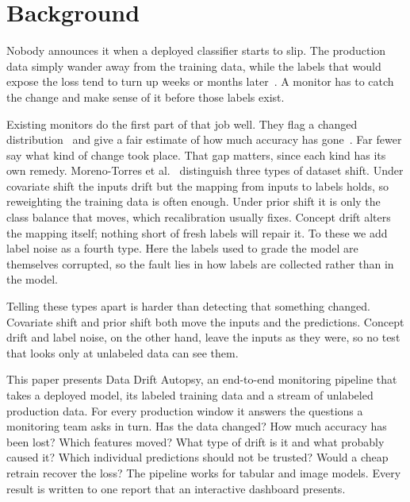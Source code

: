 \documentclass[pdflatex,referee,lineno,sn-basic]{sn-jnl}
\begin{document}

\maketitle


\section{Background}\label{sec:intro}

Nobody announces it when a deployed classifier starts to slip. The production data simply wander away from the training data, while the labels that would expose the loss tend to turn up weeks or months later~\citep{rabanser2019failing}. A monitor has to catch the change and make sense of it before those labels exist.

Existing monitors do the first part of that job well. They flag a changed distribution~\citep{rabanser2019failing} and give a fair estimate of how much accuracy has gone~\citep{garg2022atc,kivimaki2025performance}. Far fewer say what kind of change took place. That gap matters, since each kind has its own remedy. Moreno-Torres et al.~\citeyearpar{moreno2012unifying} distinguish three types of dataset shift. Under covariate shift the inputs drift but the mapping from inputs to labels holds, so reweighting the training data is often enough. Under prior shift it is only the class balance that moves, which recalibration usually fixes. Concept drift alters the mapping itself; nothing short of fresh labels will repair it. To these we add label noise as a fourth type. Here the labels used to grade the model are themselves corrupted, so the fault lies in how labels are collected rather than in the model.

Telling these types apart is harder than detecting that something changed. Covariate shift and prior shift both move the inputs and the predictions. Concept drift and label noise, on the other hand, leave the inputs as they were, so no test that looks only at unlabeled data can see them.

This paper presents Data Drift Autopsy, an end-to-end monitoring pipeline that takes a deployed model, its labeled training data and a stream of unlabeled production data. For every production window it answers the questions a monitoring team asks in turn. Has the data changed? How much accuracy has been lost? Which features moved? What type of drift is it and what probably caused it? Which individual predictions should not be trusted? Would a cheap retrain recover the loss? The pipeline works for tabular and image models. Every result is written to one report that an interactive dashboard presents.
\end{document}
